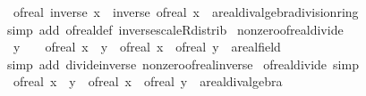 \begin{isabellebody}
\ \ {\isachardoublequoteopen}of{\isacharunderscore}{\kern0pt}real\ {\isacharparenleft}{\kern0pt}inverse\ x{\isacharparenright}{\kern0pt}\ {\isacharequal}{\kern0pt}\ inverse\ {\isacharparenleft}{\kern0pt}of{\isacharunderscore}{\kern0pt}real\ x\ {\isacharcolon}{\kern0pt}{\isacharcolon}{\kern0pt}\ {\isacharprime}{\kern0pt}a{\isacharcolon}{\kern0pt}{\isacharcolon}{\kern0pt}{\isacharbraceleft}{\kern0pt}real{\isacharunderscore}{\kern0pt}div{\isacharunderscore}{\kern0pt}algebra{\isacharcomma}{\kern0pt}division{\isacharunderscore}{\kern0pt}ring{\isacharbraceright}{\kern0pt}{\isacharparenright}{\kern0pt}{\isachardoublequoteclose}\isanewline
%
\isadelimproof
\ \ %
\endisadelimproof
%
\isatagproof
{}\isamarkupfalse%
\ {\isacharparenleft}{\kern0pt}simp\ add{\isacharcolon}{\kern0pt}\ of{\isacharunderscore}{\kern0pt}real{\isacharunderscore}{\kern0pt}def\ inverse{\isacharunderscore}{\kern0pt}scaleR{\isacharunderscore}{\kern0pt}distrib{\isacharparenright}{\kern0pt}%
\endisatagproof
{\isafoldproof}%
%
\isadelimproof
\isanewline
%
\endisadelimproof
\isanewline
{}\isamarkupfalse%
\ nonzero{\isacharunderscore}{\kern0pt}of{\isacharunderscore}{\kern0pt}real{\isacharunderscore}{\kern0pt}divide{\isacharcolon}{\kern0pt}\isanewline
\ \ {\isachardoublequoteopen}y\ {\isasymnoteq}\ {}\ {\isasymLongrightarrow}\ of{\isacharunderscore}{\kern0pt}real\ {\isacharparenleft}{\kern0pt}x\ {\isacharslash}{\kern0pt}\ y{\isacharparenright}{\kern0pt}\ {\isacharequal}{\kern0pt}\ {\isacharparenleft}{\kern0pt}of{\isacharunderscore}{\kern0pt}real\ x\ {\isacharslash}{\kern0pt}\ of{\isacharunderscore}{\kern0pt}real\ y\ {\isacharcolon}{\kern0pt}{\isacharcolon}{\kern0pt}\ {\isacharprime}{\kern0pt}a{\isacharcolon}{\kern0pt}{\isacharcolon}{\kern0pt}real{\isacharunderscore}{\kern0pt}field{\isacharparenright}{\kern0pt}{\isachardoublequoteclose}\isanewline
%
\isadelimproof
\ \ %
\endisadelimproof
%
\isatagproof
{}\isamarkupfalse%
\ {\isacharparenleft}{\kern0pt}simp\ add{\isacharcolon}{\kern0pt}\ divide{\isacharunderscore}{\kern0pt}inverse\ nonzero{\isacharunderscore}{\kern0pt}of{\isacharunderscore}{\kern0pt}real{\isacharunderscore}{\kern0pt}inverse{\isacharparenright}{\kern0pt}%
\endisatagproof
{\isafoldproof}%
%
\isadelimproof
\isanewline
%
\endisadelimproof
\isanewline
{}\isamarkupfalse%
\ of{\isacharunderscore}{\kern0pt}real{\isacharunderscore}{\kern0pt}divide\ {\isacharbrackleft}{\kern0pt}simp{\isacharbrackright}{\kern0pt}{\isacharcolon}{\kern0pt}\isanewline
\ \ {\isachardoublequoteopen}of{\isacharunderscore}{\kern0pt}real\ {\isacharparenleft}{\kern0pt}x\ {\isacharslash}{\kern0pt}\ y{\isacharparenright}{\kern0pt}\ {\isacharequal}{\kern0pt}\ {\isacharparenleft}{\kern0pt}of{\isacharunderscore}{\kern0pt}real\ x\ {\isacharslash}{\kern0pt}\ of{\isacharunderscore}{\kern0pt}real\ y\ {\isacharcolon}{\kern0pt}{\isacharcolon}{\kern0pt}\ {\isacharprime}{\kern0pt}a{\isacharcolon}{\kern0pt}{\isacharcolon}{\kern0pt}real{\isacharunderscore}{\kern0pt}div{\isacharunderscore}{\kern0pt}algebra{\isacharparenright}{\kern0pt}{\isachardoublequoteclose}\isanewline

\end{isabellebody}
